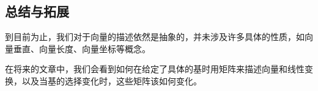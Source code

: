 \subsection{总结与拓展}

到目前为止，我们对于向量的描述依然是抽象的，并未涉及许多具体的性质，如向量垂直、向量长度、向量坐标等概念。

在将来的文章中，我们会看到如何在给定了具体的基时用矩阵来描述向量和线性变换，以及当基的选择变化时，这些矩阵该如何变化。


